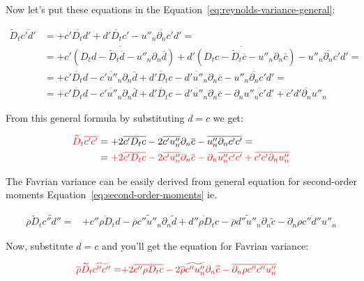 \documentclass[10pt,paper=a4]{report}
\newcommand{\eht}{\overline}
\newcommand{\fht}{\widetilde}
\begin{document}
Now let's put these equations in the Equation~\ref{eq:reynolds-variance-general}:

\begin{align}
\fht{D}_t \eht{c'd'} & = +\eht{c' D_t d'} + \eht{d' D_t c'} - \eht{u''_n \partial_n c'd'} = \\
& = +\eht{c' (D_t d - \fht{D}_t \eht{d} - u''_n \partial_n \eht{d})} + \eht{d' (D_t c - \fht{D}_t \eht{c} - u''_n \partial_n \eht{c})} - \eht{u''_n \partial_n c'd'} = \\
& = +\eht{c'D_t d} - \eht{c'u''_n}\partial_n \eht{d} + \eht{d' D_t c} - \eht{d'u''_n}\partial_n \eht{c} - \eht{u''_n \partial_n c'd'} = \\
& = +\eht{c'D_t d} - \eht{c'u''_n}\partial_n \eht{d} + \eht{d' D_t c} - \eht{d'u''_n}\partial_n \eht{c} - \partial_n \eht{u''_n c'd'} + \eht{c'd'\partial_n u''_n}
\end{align}

From this general formula by substituting $d = c$ we get:

\begin{align}
{\color{red} \fht{D}_t \eht{c'c'}} & = + 2 \eht{c' D_t c} - 2 \eht{c'u''_n} \partial_n \eht{c} - \eht{u''_n \partial_n c'c'} = \\
& = {\color{red}+2 \eht{c' D_t c} - 2 \eht{c'u''_n} \partial_n \eht{c} - \partial_n \eht{u''_n c' c'} + \eht{c' c' \partial_n u''_n}}
\end{align}

\noindent
The Favrian variance can be easily derived from general equation for second-order moments Equation~\ref{eq:second-order-moments} ie.

\begin{align}
\eht{\rho}\fht{D}_t \fht{c''d''} = & +\eht{c''\rho D_t d} - \eht{\rho}\fht{c''u''_n}\partial_n\fht{d} + \eht{d''\rho D_t c} - \eht{\rho}\fht{d''u''_n}\partial_n\fht{c} - \eht{\partial_n{\rho c''d'' u''_n}}  
\end{align}

Now, substitute $d = c$ and you'll get the equation for Favrian variance:

\begin{align}
{\color{red}\eht{\rho}\fht{D}_t \fht{c''c''} =} & {\color{red}+2 \eht{c''\rho D_t c} - 2\eht{\rho}\fht{c''u''_n}\partial_n\fht{c} - \eht{\partial_n{\rho c''c'' u''_n}}} 
\end{align}

\fontsize{12pt}{20pt}

\newpage
\end{document}
